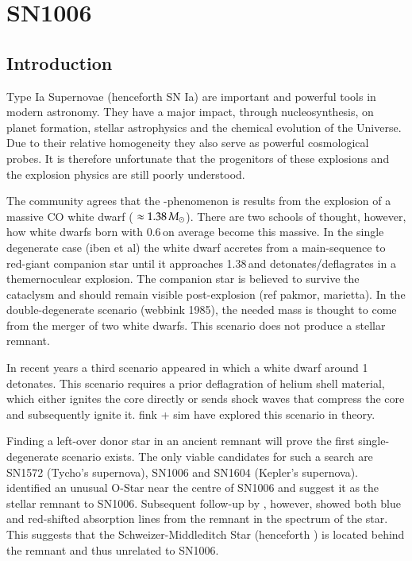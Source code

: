\chapter{SN1006}
\label{chap:sn1006}


\section{Introduction}
Type Ia Supernovae (henceforth SN Ia) are important and powerful tools in modern astronomy. They have a major impact, through nucleosynthesis, on planet formation, stellar astrophysics and the chemical evolution of the Universe. Due to their relative homogeneity they also serve as powerful cosmological probes. It is therefore unfortunate that the progenitors of these explosions and the explosion physics are still poorly understood.

The community agrees that the \snia-phenomenon is results from the explosion of a massive CO white dwarf ( $\approx 1.38\,\hbox{$M_{\odot}$}$). There are two schools of thought, however, how white dwarfs born with 0.6\,\msun on average become this massive. In the single degenerate case (iben et al) the white dwarf accretes from a main-sequence to red-giant companion star until it approaches 1.38\,\msun and detonates/deflagrates in a themernoculear explosion. The companion star is believed to survive the cataclysm and should remain visible post-explosion (ref pakmor, marietta). 
In the double-degenerate scenario (webbink 1985), the needed mass is thought to come from the merger of two white dwarfs. This scenario does not produce a stellar remnant. 

In recent years a third scenario appeared in which a white dwarf around 1\,\msun detonates. This scenario requires a prior deflagration of helium shell material, which either ignites the core directly or sends shock waves that compress the core and subsequently ignite it. fink + sim have explored this scenario in theory. 

Finding a left-over donor star in an ancient remnant will prove the first single-degenerate scenario exists. The only viable candidates for such a search are SN1572 (Tycho's supernova), SN1006 and SN1604 (Kepler's supernova). \citet{1980ApJ...241.1039S} identified an unusual O-Star near the centre of SN1006 and suggest it as the stellar remnant to SN1006. Subsequent follow-up by \cite{1983ApJ...269L...5W}, however, showed both blue and red-shifted absorption lines from the remnant in the spectrum of the star. This suggests that the Schweizer-Middleditch Star (henceforth \smstar) is located behind the remnant and thus unrelated to SN1006. 

